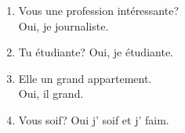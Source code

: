 \begin{enumerate}
    \item Vous  une profession intéressante? \\ 
          Oui, je  journaliste.
    \item Tu  étudiante? Oui, je  étudiante.
    \item Elle  un grand appartement. \\
          Oui, il  grand.
    \item Vous  soif? Oui j' soif et j' faim. 
\end{enumerate}